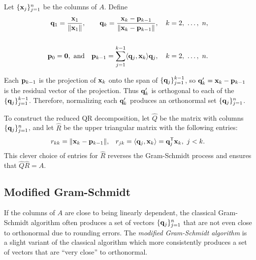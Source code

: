 Let $\{\mathbf{x}_j\}_{j=1}^n$ be the columns of $A$.
Define
%
\begin{align*}
\q_1 = \frac{\x_1}{\|\x_1\|},
&&
\q_{k} = \frac{\x_k - \p_{k-1}}{\|\x_k - \p_{k-1}\|},\quad k=2,\ \ldots,\ n,
\\ \\
\p_0 = \0,\ \text{and}
&&
\p_{k-1} = \sum_{j=1}^{k-1} \langle \q_j, \x_k\rangle \q_j,\quad k=2,\ \ldots,\ n.
\end{align*}

Each $\mathbf{p}_{k-1}$ is the projection of $\mathbf{x}_k$ onto the span of $\{\mathbf{q}_j\}_{j=1}^{k-1}$, so $\mathbf{q}_k' = \mathbf{x}_k - \mathbf{p}_{k-1}$ is the residual vector of the projection.
Thus $\mathbf{q}_k'$ is orthogonal to each of the $\{\mathbf{q}_j\}_{j=1}^{k-1}$.
Therefore, normalizing each $\mathbf{q}_k'$ produces an orthonormal set $\{\mathbf{q}_j\}_{j=1}^n$.

To construct the reduced QR decomposition, let $\widehat{Q}$ be the matrix with columns $\{\mathbf{q}_j\}_{j=1}^n$, and let $\widehat{R}$ be the upper triangular matrix with the following entries:
%
\begin{align*}
r_{kk} = \|\mathbf{x}_k-\mathbf{p}_{k-1}\|,
&&
r_{jk} = \langle \mathbf{q}_j, \mathbf{x}_k\rangle = \mathbf{q}_j^{\mathsf T}\mathbf{x}_k,\ j < k.
\end{align*}
%
This clever choice of entries for $\widehat{R}$ reverses the Gram-Schmidt process and ensures that $\widehat{Q}\widehat{R} = A$.

\begin{comment}
To construct the full QR decomposition, choose $m - n$ vectors $\{\x_j\}_{j=n+1}^m$ such that the entire set of original vectors $\{\x_j\}_{j=1}^m$ is linearly independent, then continue the Gram-Schmidt process to produce the additional columns of $Q$.
Appending $m - n$ rows of zeros to $\widehat{R}$ results in $R$.
\end{comment}

\subsection*{Modified Gram-Schmidt} %

If the columns of $A$ are close to being linearly dependent, the classical Gram-Schmidt algorithm often produces a set of vectors $\{\mathbf{q}_j\}_{j=1}^n$ that are not even close to orthonormal due to rounding errors.
The \emph{modified Gram-Schmidt algorithm} is a slight variant of the classical algorithm which more consistently produces a set of vectors that are ``very close'' to orthonormal.

